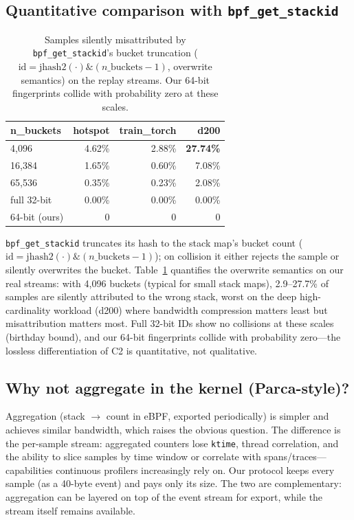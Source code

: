 \documentclass[letterpaper,twocolumn,10pt]{article}
\begin{document}
\subsection{Quantitative comparison with \texttt{bpf\_get\_stackid}}
\begin{table}[t]
\centering
\small
\begin{tabular}{@{}lrrr@{}}
\toprule
n\_buckets & hotspot & train\_torch & d200 \\
\midrule
4{,}096 & 4.62\% & 2.88\% & \textbf{27.74\%} \\
16{,}384 & 1.65\% & 0.60\% & 7.08\% \\
65{,}536 & 0.35\% & 0.23\% & 2.08\% \\
full 32-bit & 0.00\% & 0.00\% & 0.00\% \\
\midrule
64-bit (ours) & 0 & 0 & 0 \\
\bottomrule
\end{tabular}
\caption{Samples silently misattributed by \texttt{bpf\_get\_stackid}'s
bucket truncation ($\text{id} = \text{jhash2}(\cdot) \&
(n\_\text{buckets}-1)$, overwrite semantics) on the replay streams.
Our 64-bit fingerprints collide with probability zero at these scales.}
\label{tab:stackid}
\end{table}
\texttt{bpf\_get\_stackid} \cite{bpfdocs} truncates its hash to the
stack map's bucket count ($\text{id} = \text{jhash2}(\cdot) \&
(n\_\text{buckets}-1)$); on collision it either rejects the sample or
silently overwrites the bucket. Table~\ref{tab:stackid} quantifies the
overwrite semantics on our real streams: with 4{,}096 buckets (typical for
small stack maps), 2.9--27.7\% of samples are silently attributed to the
wrong stack, worst on the deep high-cardinality workload (d200) where
bandwidth compression matters least but misattribution matters most. Full
32-bit IDs show no collisions at these scales (birthday bound), and our
64-bit fingerprints collide with probability zero---the lossless
differentiation of C2 is quantitative, not qualitative.

\subsection{Why not aggregate in the kernel (Parca-style)?}
Aggregation (stack $\rightarrow$ count in eBPF, exported periodically) is
simpler and achieves similar bandwidth, which raises the obvious question.
The difference is the per-sample stream: aggregated counters lose
\texttt{ktime}, thread correlation, and the ability to slice samples by
time window or correlate with spans/traces---capabilities continuous
profilers increasingly rely on. Our protocol keeps every sample (as a
40-byte event) and pays only its size. The two are complementary:
aggregation can be layered on top of the event stream for export, while
the stream itself remains available.
\end{document}
